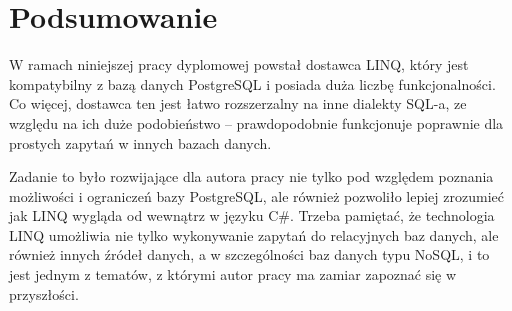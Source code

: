 \chapter{Podsumowanie}
W ramach niniejszej pracy dyplomowej powstał dostawca LINQ, który jest kompatybilny z bazą danych PostgreSQL i posiada duża liczbę funkcjonalności. Co więcej, dostawca ten jest łatwo rozszerzalny na inne dialekty SQL-a, ze względu na ich duże podobieństwo – prawdopodobnie funkcjonuje poprawnie dla prostych zapytań w innych bazach danych.

Zadanie to było rozwijające dla autora pracy nie tylko pod względem poznania możliwości i ograniczeń bazy PostgreSQL, ale również pozwoliło lepiej zrozumieć jak LINQ wygląda od wewnątrz w języku C\#. Trzeba pamiętać, że technologia LINQ umożliwia nie tylko wykonywanie zapytań do relacyjnych baz danych, ale również innych źródeł danych, a w szczególności baz danych typu NoSQL, i to jest jednym z tematów, z którymi autor pracy ma zamiar zapoznać się w przyszłości.